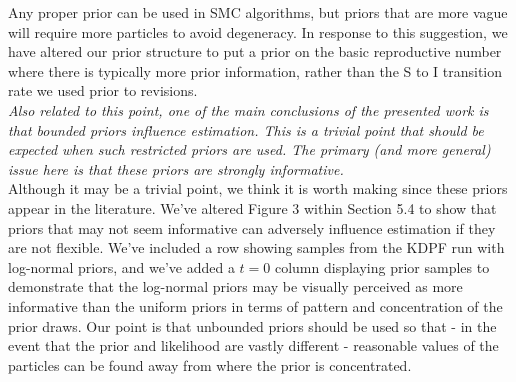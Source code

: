 \documentclass{article}
\begin{document}
Any proper prior can be used in SMC algorithms, but priors that are more vague will require more particles to avoid degeneracy.
In response to this suggestion, we have altered our prior structure to put a prior on the basic reproductive number where there is typically more prior information, rather than the S to I transition rate we used prior to revisions. \\




\noindent \emph{Also related to this point, one of the main conclusions of the presented work is that bounded priors influence estimation. This is a trivial point that should be expected when such restricted priors are used. The primary (and more general) issue here is that these priors are strongly informative.} \\

Although it may be a trivial point, we think it is worth making since these priors appear in the literature. We've altered Figure 3 within Section 5.4 to show that priors that may not seem informative can adversely influence estimation if they are not flexible. We've included a row showing samples from the KDPF run with log-normal priors, and we've added a $t = 0$ column displaying prior samples to demonstrate that the log-normal priors may be visually perceived as more informative than the uniform priors in terms of pattern and concentration of the prior draws. Our point is that unbounded priors should be used so that - in the event that the prior and likelihood are vastly different - reasonable values of the particles can be found away from where the prior is concentrated. \\
\end{document}
